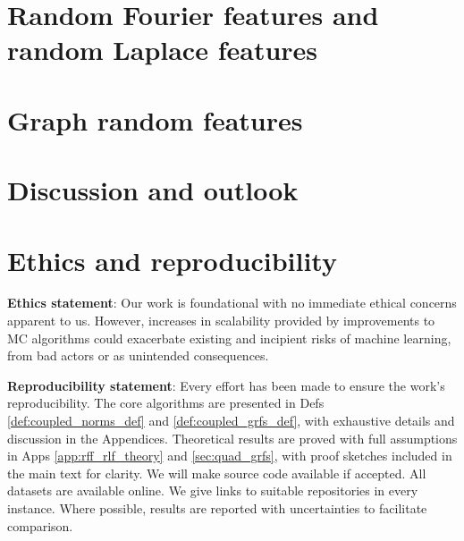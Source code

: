 \documentclass{article}
\begin{document}
\section{Random Fourier features and random Laplace features} \label{sec:rffs_and_rlfs}
 

\vspace{-1mm}
\section{Graph random features} \label{sec:grfs}
\vspace{-2mm}


\vspace{-2mm}
\section{Discussion and outlook} \label{sec:discussion}





\newpage

\section{Ethics and reproducibility}
\textbf{Ethics statement}: Our work is foundational with no immediate ethical concerns apparent to us. However, increases in scalability provided by improvements to MC algorithms could exacerbate existing and incipient risks of machine learning, from bad actors or as unintended consequences. 

\textbf{Reproducibility statement}: Every effort has been made to ensure the work's reproducibility. 
The core algorithms are presented in Defs \ref{def:coupled_norms_def} and \ref{def:coupled_grfs_def}, with exhaustive details and discussion in the Appendices.
Theoretical results are proved with full assumptions in Apps \ref{app:rff_rlf_theory} and \ref{sec:quad_grfs}, with proof sketches included in the main text for clarity. 
We will make source code available if accepted.
All datasets are available online. 
We give links to suitable repositories in every instance. 
Where possible, results are reported with uncertainties to facilitate comparison. 

\newpage

%



\newpage

\appendices


%
\end{document}
